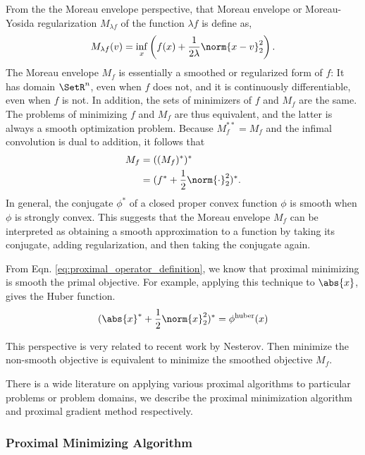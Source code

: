 \documentclass[
10pt, %
a4paper, %
oneside, %
headinclude,footinclude, %
BCOR5mm, %
]{scrartcl}
\begin{document}
From the the Moreau envelope perspective, that Moreau envelope or Moreau-Yosida 
regularization $M_{\lambda f}$ of the function $\lambda f$ is define as,
\begin{equation*}
	M_{\lambda f}(v) = \inf_{x} \left( f(x) + 
	\frac{1}{2\lambda} \norm{x-v}_2^2  \right).
\end{equation*}
The Moreau envelope $M_f$ is essentially a smoothed or regularized
form of $f$: It has domain $\SetR^n$, even when $f$ does not, and it is 
continuously differentiable, even when $f$ is not. In addition, the sets of 
minimizers of $f$ and $M_f$ are the same. The problems of minimizing 
$f$ and $M_{f}$ are thus equivalent, and the latter is always a smooth 
optimization problem. Because $M_f^{**} = M_f $ and the infimal convolution is 
dual to addition, it follows that
\begin{align}
	M_f &= ((M_f)^*)^* \nonumber\\
	    &= (f^* +  \frac{1}{2} \norm{\cdot}_2^2)^*.
\end{align}
In general, the conjugate $\phi^*$ of a closed proper convex function $\phi$ is 
smooth when $\phi$ is strongly convex. This suggests that the Moreau envelope 
$M_f$ can be interpreted as obtaining a smooth approximation to a function by 
taking its conjugate, adding regularization, and then taking the conjugate 
again.

From Eqn. \eqref{eq:proximal_operator_definition}, we know that proximal 
minimizing is smooth the primal objective. For example, applying this technique 
to $ \abs{x} $, gives the Huber function.
\begin{equation*}
	(\abs{x}^* + \frac{1}{2} \norm{x}_2^2)^* = \phi^{\text{huber}}(x)
\end{equation*}


This perspective is very related to 
recent work by Nesterov\cite{nesterov2005smooth}. Then minimize the 
non-smooth objective is equivalent to minimize the smoothed objective $M_f$.

There is a wide literature on applying various 
proximal algorithms to particular problems or problem domains, we describe
the proximal minimization algorithm and proximal gradient method respectively.

\subsubsection{Proximal Minimizing Algorithm}
\end{document}
